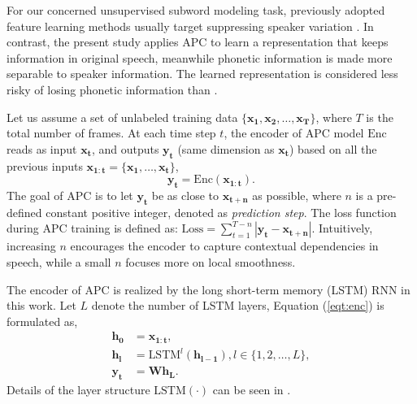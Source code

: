 \documentclass[a4paper]{article}
\begin{document}
For our concerned unsupervised subword modeling task, previously adopted feature learning methods 
usually target suppressing speaker variation \cite{Feng2019improving,heck2017feature}. In contrast, the present study applies APC to learn a representation that keeps information in original speech, meanwhile phonetic information is made more separable to speaker information. The learned representation is considered less risky of losing phonetic information than \cite{Feng2019improving,heck2017feature}.



Let us assume a set of unlabeled training data $\{\bm{x_1}, \bm{x_2}, \ldots, \bm{x_T}\}$, where $T$ is the total number of frames. At each time step $t$, the encoder of APC model $\textrm{Enc}$ reads as input
$\bm{x_t}$, 
and outputs $\bm{y_t}$ (same dimension as $\bm{x_t}$) based on all the previous inputs $\bm{x_{1:t}}=\{\bm{x_1},\ldots,\bm{x_t}\}$,
\begin{equation}
    \bm{y_t} = \textrm{Enc} (\bm{x_{1:t}}).
    \label{eqt:enc}
\end{equation}
The goal of APC is to let $\bm{y_t}$ be as close to $\bm{x_{t+n}}$ as possible, where $n$ is a pre-defined constant positive integer, denoted as \textit{prediction step}. 
The loss function during APC   training is defined as: $\textrm{Loss} = \sum_{t=1}^{T-n} \left| \bm{y_t} - \bm{x_{t+n}} \right|$.
Intuitively, increasing $n$ encourages the   encoder to capture contextual dependencies in speech, 
while a small $n$ focuses more on local smoothness.
 
The encoder of APC is realized by the long short-term memory (LSTM) \cite{hochreiter1997long} RNN in this work. Let $L$ denote the number of LSTM layers,  Equation (\ref{eqt:enc}) is formulated as,
\begin{align}
    \bm{h_0} &= \bm{x_{1:t}},    \\
    \bm{h_l} &= \textrm{LSTM}^l (\bm{h_{l-1}}), l\in \{1,2,\ldots, L\}, \\
    \bm{y_t} &= \bm{W} \bm{h_L}.
\end{align}
Details of the  layer structure $\textrm{LSTM} (\cdot)$ can be seen in \cite{sak2014long}.
\end{document}

